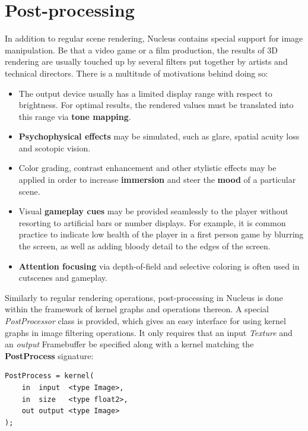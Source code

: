 \section{Post-processing}
\label{sec:PostProcessing}

In addition to regular scene rendering, Nucleus contains special support for image manipulation. Be that a video game or a film production, the results of 3D rendering are usually touched up by several filters put together by artists and technical directors. There is a multitude of motivations behind doing so:

\begin{itemize}
\item The output device usually has a limited display range with respect to brightness. For optimal results, the rendered values must be translated into this range via \textbf{tone mapping}.
\item \textbf{Psychophysical effects} may be simulated, such as glare, spatial acuity loss and scotopic vision.
\item Color grading, contrast enhancement and other stylistic effects may be applied in order to increase \textbf{immersion} and steer the \textbf{mood} of a particular scene.
\item Visual \textbf{gameplay cues} may be provided seamlessly to the player without resorting to artificial bars or number displays. For example, it is common practice to indicate low health of the player in a first person game by blurring the screen, as well as adding bloody detail to the edges of the screen.
\item \textbf{Attention focusing} via depth-of-field and selective coloring is often used in cutscenes and gameplay.
\end{itemize}

Similarly to regular rendering operations, post-processing in Nucleus is done within the framework of kernel graphs and operations thereon. A special \emph{PostProcessor} class is provided, which gives an easy interface for using kernel graphs in image filtering operations. It only requires that an input \emph{Texture} and an \emph{output} Framebuffer be specified along with a kernel matching the \textbf{PostProcess} signature:

\begin{lstlisting}[frame=single]
PostProcess = kernel(
    in  input  <type Image>,
    in  size   <type float2>,
    out output <type Image>
);
\end{lstlisting}

